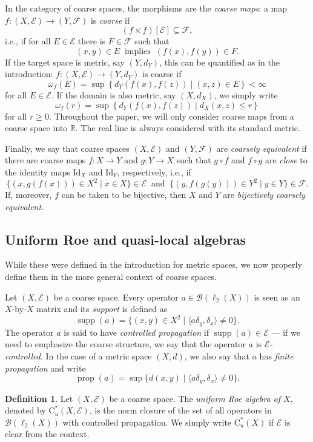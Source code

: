 \documentclass[11pt]{amsart}
\newcommand{\R}{\mathbb{R}}
\newcommand{\cB}{\mathcal{B}}
\newcommand{\cE}{\mathcal{E}}
\newcommand{\cF}{\mathcal{F}}
\newcommand{\cstu}{\mathrm{C}^*_u}
\numberwithin{equation}{section}
\theoremstyle{definition}
\newtheorem{definition}[theorem]{Definition}
\theoremstyle{remark}
\DeclareMathOperator{\supp}{supp}
\DeclareMathOperator{\propg}{prop}
\begin{document}
In the category of coarse spaces, the morphisms are the \emph{coarse maps}: a map $f\colon (X,\cE)\to (Y,\cF)$ is \emph{coarse} if
\[(f\times f)[\cE]\subseteq \cF,\]
i.e., if for all $E\in \cE$ there is $F\in \cF$ such that
\[(x,y)\in E\ \text{ implies }\ (f(x),f(y))\in F.\]
If the target space is metric, say $(Y,d_Y)$,  this can be quantified as in the introduction: $f\colon (X,\cE)\to (Y,d_Y)$ is coarse if
\[\omega_f(E)=\sup\left\{d_Y(f(x),f(z))\mid  (x,z)\in E\right\}<\infty\]
for all $E\in \cE$. If the domain is also metric, say $(X,d_X)$, we simply  write  
\[\omega_f(r)=\sup\left\{d_Y(f(x),f(z))\mid d_X (x,z)\leq r \right\}\]
for all $r\geq 0$.  Throughout the paper, we will only consider coarse maps from a coarse space   into $\R$. The real line is always considered with its standard metric.

Finally, we say that coarse spaces $(X,\cE)$ and $(Y,\cF)$ are \emph{coarsely equivalent} if there are coarse maps $f\colon X\to Y$ and $g\colon Y\to X$ such that $g\circ f$ and $f\circ g$ are \emph{close} to the identity maps $\mathrm{Id}_X$ and $\mathrm{Id}_Y$, respectively, i.e., if
\[\{(x,g(f(x)))\in X^2\mid x\in X\}\in \cE\ \text{ and }\ \{(y,f(g(y)))\in Y^2\mid y\in Y\}\in \cF.\]
If, moreover, $f$ can be taken to be bijective, then $X$ and $Y$ are \emph{bijectively coarsely equivalent}.

\subsection{Uniform Roe and quasi-local algebras} While these were defined in the introduction for metric spaces, we now properly define them in the more general context of coarse spaces. 

Let $(X,\cE)$ be a coarse space. Every operator $a\in  \cB(\ell_2(X))$ is seen as an $X$-by-$X$ matrix and its \emph{support} is defined as 
\[\supp(a)=\{(x,y)\in X^2\mid \langle a\delta_y,\delta_x\rangle\neq 0\}.\]
The operator $a$ is said to have \emph{controlled propagation} if $\supp(a)\in \cE$ --- if we need to emphasize the coarse structure, we say that the operator $a$ is \emph{$\cE$-controlled}. In the case of a metric space $(X,d)$, we also say that $a$ has \emph{finite propagation} and write
\[\propg(a)=\sup\{d(x,y)\mid \langle a\delta_y,\delta_x\rangle\neq 0\}.\]

\begin{definition}
    Let $(X,\cE)$ be a coarse space. The \emph{uniform Roe algebra of $X$}, denoted by $\cstu(X,\cE)$, is the norm closure of the set of all operators in $\cB(\ell_2(X))$ with controlled propagation. We simply write  $\cstu(X)$ if $\cE$ is clear from the context.
    \end{definition}
\end{document}
